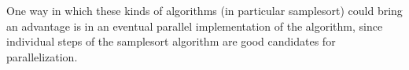 \documentclass{article}
\begin{document}
One way in which these kinds of algorithms (in particular samplesort) could bring an advantage is in an eventual parallel implementation of the algorithm, since individual steps of the samplesort algorithm are good candidates for parallelization.






\end{document}
